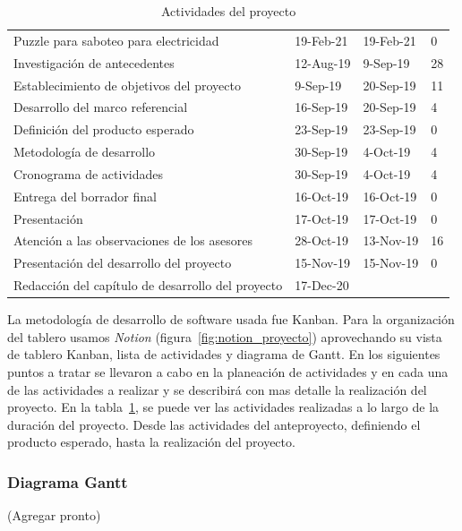 \begin{table}
\begin{tabular}{llll}
Puzzle para saboteo para electricidad              & 19-Feb-21 & 19-Feb-21 & 0      \\
Investigación de antecedentes                      & 12-Aug-19 & 9-Sep-19  & 28     \\
Establecimiento de objetivos del proyecto          & 9-Sep-19  & 20-Sep-19 & 11     \\
Desarrollo del marco referencial                   & 16-Sep-19 & 20-Sep-19 & 4      \\
Definición del producto esperado                   & 23-Sep-19 & 23-Sep-19 & 0      \\
Metodología de desarrollo                          & 30-Sep-19 & 4-Oct-19  & 4      \\
Cronograma de actividades                          & 30-Sep-19 & 4-Oct-19  & 4      \\
Entrega del borrador final                         & 16-Oct-19 & 16-Oct-19 & 0      \\
Presentación                                       & 17-Oct-19 & 17-Oct-19 & 0      \\
Atención a las observaciones de los asesores       & 28-Oct-19 & 13-Nov-19 & 16     \\
Presentación del desarrollo del proyecto           & 15-Nov-19 & 15-Nov-19 & 0      \\
Redacción del capítulo de desarrollo del proyecto  & 17-Dec-20 &           &       
\end{tabular}
\label{table:fechas_actividades}
\caption{Actividades del proyecto}
\end{table}

La metodología de desarrollo de software usada fue Kanban. Para la organización del tablero usamos \textit{Notion} (figura~\ref{fig:notion_proyecto}) aprovechando su vista de tablero Kanban, lista de actividades y diagrama de Gantt. En los siguientes puntos a tratar se llevaron a cabo en la planeación de actividades y en cada una de las actividades a realizar y se describirá con mas detalle la realización del proyecto. En la tabla~\ref{table:fechas_actividades}, se puede ver las actividades realizadas a lo largo de la duración del proyecto. Desde las actividades del anteproyecto, definiendo el producto esperado, hasta la realización del proyecto. 

\subsubsection{Diagrama Gantt}
(Agregar pronto)

